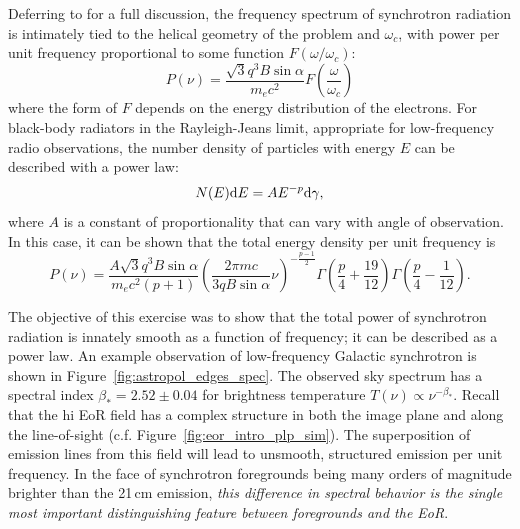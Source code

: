 Deferring to \cite{Rybicki.79} for a full discussion, the frequency spectrum of synchrotron radiation is intimately tied to the helical geometry of the problem and $\omega_c$, with power per unit frequency proportional to some function $F(\omega/\omega_c)$:
\begin{equation}
P(\nu) = \frac{\sqrt{3}q^3B\sin\alpha}{m_e c^2}F(\frac{\omega}{\omega_c})
\label{eq:astropol_sync_power}
\end{equation}
where the form of $F$ depends on the energy distribution of the electrons. For black-body radiators in the Rayleigh-Jeans limit, appropriate for low-frequency radio observations, the number density of particles with energy $E$ can be described with a power law:
\begin{equation}
N(E){\rm d}E = AE^{-p}{\rm d}\gamma ,
\end{equation}
where $A$ is a constant of proportionality that can vary with angle of observation. In this case, it can be shown that the total energy density per unit frequency is
\begin{equation}
P(\nu) = \frac{A\sqrt{3}q^3B\sin\alpha}{m_e c^2 (p+1)}\left(\frac{2\pi mc}{3qB\sin\alpha}\nu\right)^{-{\frac{p-1}{2}}}\Gamma\left(\frac{p}{4} + \frac{19}{12}\right)\Gamma\left(\frac{p}{4} - \frac{1}{12}\right).
\end{equation}

The objective of this exercise was to show that the total power of synchrotron radiation is innately smooth as a function of frequency; it can be described as a power law. An example observation of low-frequency Galactic synchrotron is shown in Figure~\ref{fig:astropol_edges_spec}. The observed sky spectrum has a spectral index $\beta_*=2.52\pm0.04$ for brightness temperature $T(\nu)\propto\nu^{-\beta_*}$. Recall that the {\sc hi} EoR field has a complex structure in both the image plane and along the line-of-sight (c.f. Figure~\ref{fig:eor_intro_plp_sim}). The superposition of emission lines from this field will lead to unsmooth, structured emission per unit frequency.
In the face of synchrotron foregrounds being many orders of magnitude brighter than the 21\,cm emission, \textit{this difference in spectral behavior is the single most important distinguishing feature between foregrounds and the EoR}.


